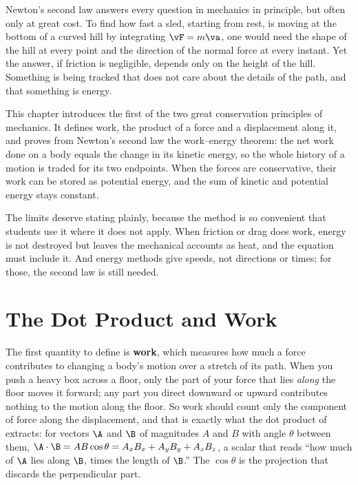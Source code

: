 
\label{ch:energy}

Newton's second law answers every question in mechanics in principle, but often only at great cost. To
find how fast a sled, starting from rest, is moving at the bottom of a curved hill by integrating $\vF=m\va$, one would need the
shape of the hill at every point and the direction of the normal force at every instant. Yet the answer, if
friction is negligible, depends only on the height of the hill. Something is being tracked that does not
care about the details of the path, and that something is energy.

This chapter introduces the first of the two great conservation principles of mechanics. It defines
work, the product of a force and a displacement along it, and proves from Newton's second law the
work--energy theorem: the net work done on a body equals the change in its kinetic energy, so the whole
history of a motion is traded for its two endpoints. When the forces are conservative, their work can be
stored as potential energy, and the sum of kinetic and potential energy stays constant.

The limits deserve stating plainly, because the method is so convenient that students use it where it
does not apply. When friction or drag does work, energy is not destroyed but leaves the mechanical
accounts as heat, and the equation must include it. And energy methods give speeds, not directions or
times; for those, the second law is still needed.

\section{The Dot Product and Work}

The first quantity to define is \textbf{work}, which measures how much a force contributes to changing a
body's motion over a stretch of its path. When you push a heavy box across a floor, only the part of your
force that lies \emph{along} the floor moves it forward; any part you direct downward or upward
contributes nothing to the motion along the floor. So work should count only the component of force along
the displacement, and that is exactly what the dot product of  extracts: for vectors
$\A$ and $\B$ of magnitudes $A$ and $B$ with angle $\theta$ between them,
$\A\cdot\B=AB\cos\theta=A_xB_x+A_yB_y+A_zB_z$, a scalar that reads ``how much of $\A$ lies along $\B$,
times the length of $\B$.'' The $\cos\theta$ is the projection that discards the perpendicular part.

